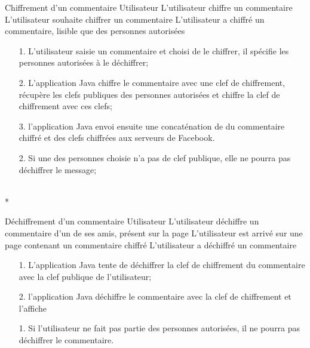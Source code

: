 \documentclass[a4paper,11pt,french]{article}
\begin{document}
\fiche
	{Chiffrement d'un commentaire}
	{Utilisateur}
	{L'utilisateur chiffre un commentaire}
	{}
	{L'utilisateur souhaite chiffrer un commentaire}
	{L'utilisateur a chiffré un commentaire, lisible que des personnes 
        autorisées}
	{\begin{itemize}
	    \item[]
	  \item[1.] L'utilisateur saisie un commentaire et choisi de le chiffrer,
          il spécifie les personnes autorisées à le déchiffrer;
	\end{itemize}
	}
	{\begin{itemize}
        \item[]
		\item[2.] L'application Java chiffre le commentaire avec une clef 
        de chiffrement, récupère les clefs publiques
        des personnes autorisées et chiffre la clef de chiffrement
        avec ces clefs;
		\item[3.] l'application Java envoi ensuite une concaténation de 
        du commentaire chiffré et des clefs chiffrées aux serveurs de Facebook.
	\end{itemize}
	}
	{}
\flots
    {\begin{itemize}
    \item[]
    \item[2.] Si une des personnes choisie n'a pas de clef publique,
        elle ne pourra pas déchiffrer le message;
    \end{itemize}
    }
	{}    
\\*

\fiche
	{Déchiffrement d'un commentaire}
	{Utilisateur}
	{L'utilisateur déchiffre un commentaire d'un de ses amis, présent sur la
        page}
	{}
	{L'utilisateur est arrivé sur une page contenant un commentaire chiffré}
	{L'utilisateur a déchiffré un commentaire}
    {}
	{\begin{itemize}
        \item[]
		\item[1.] L'application Java tente de déchiffrer la clef de chiffrement
            du commentaire avec la clef publique de l'utilisateur;
		\item[2.] l'application Java déchiffre le commentaire avec la clef
            de chiffrement et l'affiche
	\end{itemize}
	}
	{}
\flots
    {}
    {\begin{itemize}
    \item[]
    \item[1.] Si l'utilisateur ne fait pas partie des personnes
        autorisées, il ne pourra pas déchiffrer le commentaire.
    \end{itemize}
    }
	{}    
\end{document}
